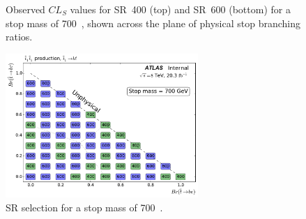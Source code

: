 \begin{figure}[ht]
  \centering
  \caption{
    Observed
    $CL_S$ values for SR~400 (top) and SR~600 (bottom) for a stop mass of
    700~\GeV,
    shown across the plane of physical stop branching ratios.
  }
\end{figure}

\begin{figure}[ht]
  \centering
  \includegraphics[width=0.65\textwidth]
    {figs/blstop/region_selection/region_choice_vs_br_m_700.pdf}
  \caption{
    SR selection for a stop mass of 700~\GeV.
  }
\end{figure}

